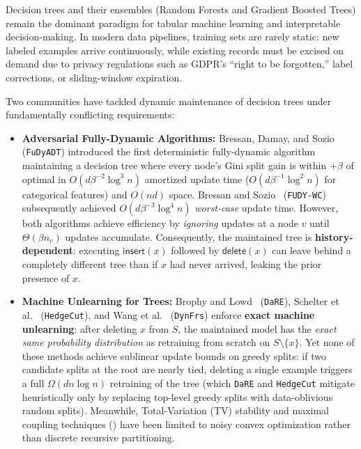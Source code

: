 \documentclass[11pt]{article}
\theoremstyle{definition}
\begin{document}
Decision trees and their ensembles (Random Forests and Gradient Boosted Trees) remain the dominant paradigm for tabular machine learning and interpretable decision-making. In modern data pipelines, training sets are rarely static: new labeled examples arrive continuously, while existing records must be excised on demand due to privacy regulations such as GDPR's ``right to be forgotten,'' label corrections, or sliding-window expiration.

Two communities have tackled dynamic maintenance of decision trees under fundamentally conflicting requirements:
\begin{itemize}[leftmargin=1.5em]
    \item \textbf{Adversarial Fully-Dynamic Algorithms:} Bressan, Damay, and Sozio~\cite{bressan2023fully} (\texttt{FuDyADT}) introduced the first deterministic fully-dynamic algorithm maintaining a decision tree where every node's Gini split gain is within $+\beta$ of optimal in $O(d \beta^{-2} \log^3 n)$ amortized update time ($O(d \beta^{-1} \log^2 n)$ for categorical features) and $O(nd)$ space. Bressan and Sozio~\cite{bressan2024worst} (\texttt{FUDY-WC}) subsequently achieved $O(d \beta^{-3} \log^4 n)$ \emph{worst-case} update time. However, both algorithms achieve efficiency by \emph{ignoring} updates at a node $v$ until $\Theta(\beta n_v)$ updates accumulate. Consequently, the maintained tree is \textbf{history-dependent}: executing $\mathsf{insert}(x)$ followed by $\mathsf{delete}(x)$ can leave behind a completely different tree than if $x$ had never arrived, leaking the prior presence of $x$.
    \item \textbf{Machine Unlearning for Trees:} Brophy and Lowd~\cite{brophy2021machine} (\texttt{DaRE}), Schelter et al.~\cite{schelter2021hedgecut} (\texttt{HedgeCut}), and Wang et al.~\cite{wang2025dynfrs} (\texttt{DynFrs}) enforce \textbf{exact machine unlearning}: after deleting $x$ from $S$, the maintained model has the \emph{exact same probability distribution} as retraining from scratch on $S \setminus \{x\}$. Yet none of these methods achieve sublinear update bounds on greedy splits: if two candidate splits at the root are nearly tied, deleting a single example triggers a full $\Omega(dn \log n)$ retraining of the tree (which \texttt{DaRE} and \texttt{HedgeCut} mitigate heuristically only by replacing top-level greedy splits with data-oblivious random splits). Meanwhile, Total-Variation (TV) stability and maximal coupling techniques (\cite{ullah2021machine}) have been limited to noisy convex optimization rather than discrete recursive partitioning.
\end{itemize}
\end{document}
